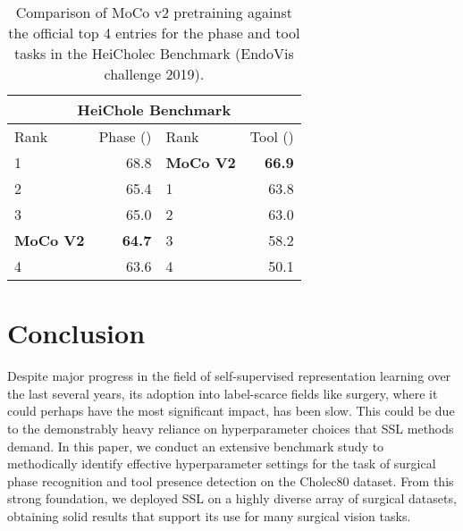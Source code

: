 \documentclass[times,twocolumn,final]{elsarticle}
\begin{document}
\begin{table}[]
  \centering
  \begin{tabular}{lr|lr}
  \hline
  \multicolumn{4}{c}{\textbf{HeiChole Benchmark}} \\ \hline
  Rank & Phase () & Rank & Tool () \\ \hline
  1                                 & 68.8                            & \cellcolor{pink} \textbf{MoCo V2} & \cellcolor{pink} \textbf{66.9} \\
  2                                 & 65.4                            & 1                                 & 63.8 \\
  3                                 & 65.0                            & 2                                 & 63.0 \\
  \cellcolor{pink} \textbf{MoCo V2} & \cellcolor{pink} \textbf{64.7}  & 3                                 & 58.2 \\
  4                                 & 63.6                            & 4                                 & 50.1 \\ \hline
  \end{tabular}
  \caption{{\color{newtext} Comparison of MoCo v2 pretraining against the official top 4 entries for the phase and tool tasks in the HeiCholec Benchmark (EndoVis challenge 2019).}}

\label{tab:heichole_leaderboard}
\end{table}








\section{Conclusion}
Despite major progress in the field of self-supervised representation learning over the last several years, its adoption into label-scarce fields like surgery, where it could perhaps have the most significant impact, has been slow. This could be due to the demonstrably heavy reliance on hyperparameter choices that SSL methods demand. In this paper, we conduct an extensive benchmark study to methodically identify effective hyperparameter settings for the task of surgical phase recognition and tool presence detection on the Cholec80 dataset. {\color{changetext} From this strong foundation, we deployed SSL on a highly diverse array of surgical datasets, obtaining solid results that support its use for many surgical vision tasks. }
\end{document}

